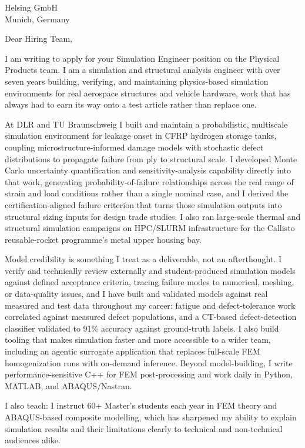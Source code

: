 \documentclass[10pt]{letter}
\begin{document}
\begin{letter}{Helsing GmbH \\ Munich, Germany}
\opening{Dear Hiring Team,}

I am writing to apply for your Simulation Engineer position on the Physical Products team. I am a simulation and structural analysis engineer with over seven years building, verifying, and maintaining physics-based simulation environments for real aerospace structures and vehicle hardware, work that has always had to earn its way onto a test article rather than replace one.

At DLR and TU Braunschweig I built and maintain a probabilistic, multiscale simulation environment for leakage onset in CFRP hydrogen storage tanks, coupling microstructure-informed damage models with stochastic defect distributions to propagate failure from ply to structural scale. I developed Monte Carlo uncertainty quantification and sensitivity-analysis capability directly into that work, generating probability-of-failure relationships across the real range of strain and load conditions rather than a single nominal case, and I derived the certification-aligned failure criterion that turns those simulation outputs into structural sizing inputs for design trade studies. I also ran large-scale thermal and structural simulation campaigns on HPC/SLURM infrastructure for the Callisto reusable-rocket programme's metal upper housing bay.

Model credibility is something I treat as a deliverable, not an afterthought. I verify and technically review externally and student-produced simulation models against defined acceptance criteria, tracing failure modes to numerical, meshing, or data-quality issues, and I have built and validated models against real measured and test data throughout my career: fatigue and defect-tolerance work correlated against measured defect populations, and a CT-based defect-detection classifier validated to 91\% accuracy against ground-truth labels. I also build tooling that makes simulation faster and more accessible to a wider team, including an agentic surrogate application that replaces full-scale FEM homogenization runs with on-demand inference. Beyond model-building, I write performance-sensitive C++ for FEM post-processing and work daily in Python, MATLAB, and ABAQUS/Nastran.

I also teach: I instruct 60+ Master's students each year in FEM theory and ABAQUS-based composite modelling, which has sharpened my ability to explain simulation results and their limitations clearly to technical and non-technical audiences alike.


\end{letter}
\end{document}
